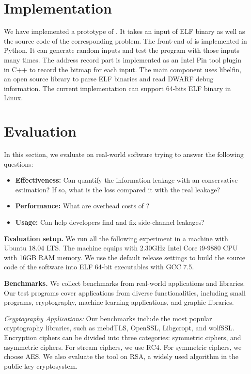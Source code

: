 \section{Implementation}
We have implemented a prototype of \ctool{}. It takes an input of ELF binary as well as the source code of the corresponding problem. The front-end of \ctool{} is implemented in Python. It can generate random inputs and test the program with those inputs many times.  The address record part is implemented as an Intel Pin tool plugin in C++ to record the bitmap for each input. The main component uses \textsf{libelfin}, an open source library to parse ELF binaries and read DWARF debug information. The current implementation can support  64-bits ELF binary in Linux. 

\section{Evaluation}
In this section, we evaluate \ctool{} on real-world software trying to answer the following questions:

\begin{itemize}
\item \textbf{Effectiveness:} Can \ctool{} quantify the information leakage with an conservative estimation? If so, what is the loss compared it with the real leakage?
\item \textbf{Performance:} What are overhead costs of \ctool{}?
\item \textbf{Usage:}  Can \ctool{} help developers find and fix side-channel leakages?
\end{itemize}

\textbf{Evaluation setup.} We run all the following experiment in a machine with Ubuntu 18.04 LTS. The machine equips with 2.30GHz Intel Core i9-9880 CPU with 16GB RAM memory. We use the default release settings to build the source code of the software into ELF 64-bit executables with GCC 7.5. 

\textbf{Benchmarks.} 
We collect benchmarks from real-world applications and libraries. Our test programs cover applications from diverse functionalities, including small programs, cryptography, machine learning applications, and graphic libraries. 



\textit{Cryptography Applications:} Our benchmarks include the most popular cryptography libraries, such as mebdTLS, OpenSSL, Libgcropt, and wolfSSL. Encryption ciphers can be divided into three categories:  symmetric ciphers, and asymmetric ciphers. For stream ciphers, we use RC4. For symmetric ciphers, we choose AES. We also evaluate the tool on RSA, a widely used algorithm in the public-key cryptosystem.

